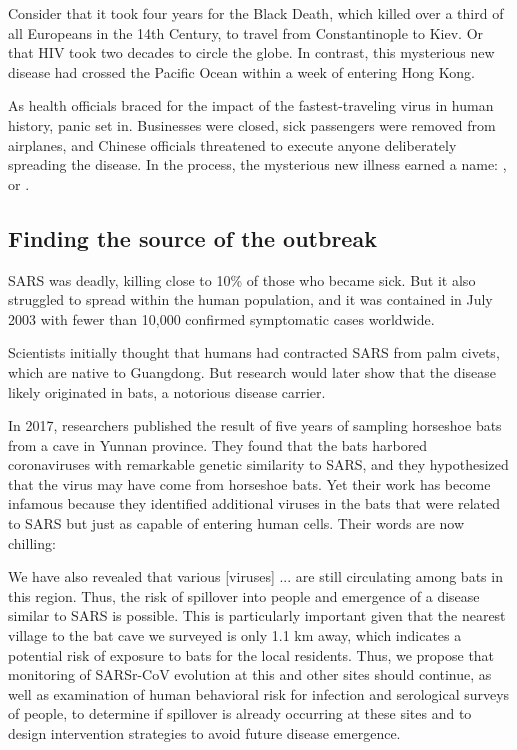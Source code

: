 Consider that it took four years for the Black Death, which killed over a third of all Europeans in the 14th Century, to travel from Constantinople to Kiev. Or that HIV took two decades to circle the globe. In contrast, this mysterious new disease had crossed the Pacific Ocean within a week of entering Hong Kong.

As health officials braced for the impact of the fastest-traveling virus in human history, panic set in. Businesses were closed, sick passengers were removed from airplanes, and Chinese officials threatened to execute anyone deliberately spreading the disease. In the process, the mysterious new illness earned a name: , or .

\FloatBarrier
{}
\subsection{Finding the source of the outbreak}

SARS was deadly, killing close to 10\% of those who became sick. But it also struggled to spread within the human population, and it was contained in July 2003 with fewer than 10,000 confirmed symptomatic cases worldwide.

Scientists initially thought that humans had contracted SARS from palm civets, which are native to Guangdong. But research would later show that the disease likely originated in bats, a notorious disease carrier.

In 2017, researchers published the result of five years of sampling horseshoe bats from a cave in Yunnan province. They found that the bats harbored coronaviruses with remarkable genetic similarity to SARS, and they hypothesized that the virus may have come from horseshoe bats. Yet their work has become infamous because they identified additional viruses in the bats that were related to SARS but just as capable of entering human cells. Their words are now chilling:

\begin{itquote}
	We have also revealed that various [viruses] ... are still circulating among bats in this region. Thus, the risk of spillover into people and emergence of a disease similar to SARS is possible. This is particularly important given that the nearest village to the bat cave we surveyed is only 1.1 km away, which indicates a potential risk of exposure to bats for the local residents. Thus, we propose that monitoring of SARSr-CoV evolution at this and other sites should continue, as well as examination of human behavioral risk for infection and serological surveys of people, to determine if spillover is already occurring at these sites and to design intervention strategies to avoid future disease emergence.
\end{itquote}

